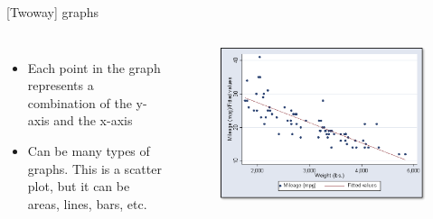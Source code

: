 \documentclass[aspectratio=169]{beamer}
\begin{document}
\begin{frame}[fragile]{[Twoway] graphs}
	\begin{columns}[c]
		\begin{itemize}
			\item Each point in the graph represents a combination of the y-axis and the x-axis
			\item Can be many types of graphs. This is a scatter plot, but it can be areas, lines, bars, etc.
		\end{itemize}
		\begin{figure}
			\centering
			\includegraphics[width=\linewidth]{img/twoway1}
		\end{figure}
	\end{columns}
\end{frame}
\end{document}
